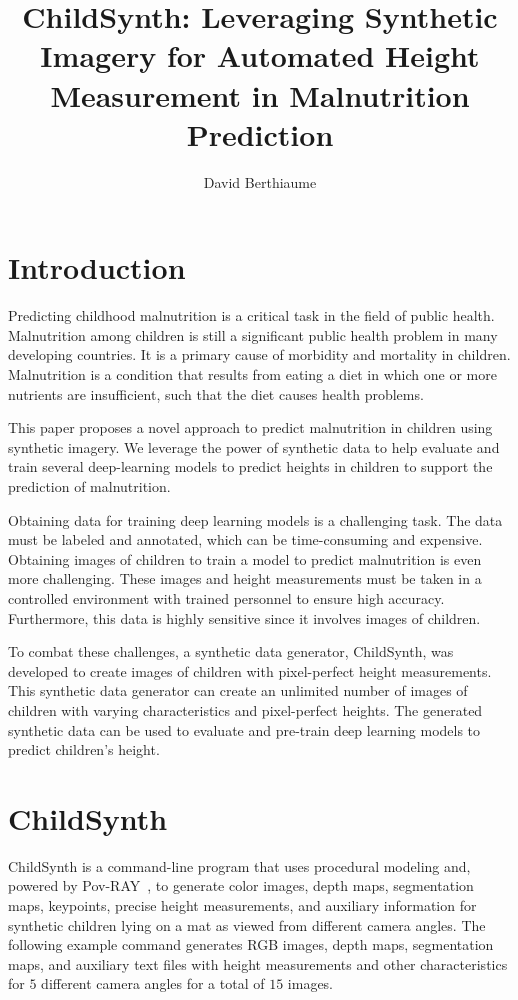 \documentclass{article}
\title{ChildSynth: Leveraging Synthetic Imagery for Automated Height Measurement in Malnutrition Prediction}
\author{David Berthiaume}
\begin{document}
\maketitle
\tableofcontents


\section{Introduction}

Predicting childhood malnutrition is a critical task in the field of public health. Malnutrition among children is still a significant public health problem in many developing countries. It is a primary cause of morbidity and mortality in children. Malnutrition is a condition that results from eating a diet in which one or more nutrients are insufficient, such that the diet causes health problems.

This paper proposes a novel approach to predict malnutrition in children using synthetic imagery. 
We leverage the power of synthetic data to help evaluate and train several deep-learning models to predict heights in children to support the prediction of malnutrition. 

Obtaining data for training deep learning models is a challenging task. The data must be labeled and annotated, which can be time-consuming and expensive. Obtaining images of children to train a model to predict malnutrition is even more challenging. These images and height measurements must be taken in a controlled environment with trained personnel to ensure high accuracy. Furthermore, this data is highly sensitive since it involves images of children.

To combat these challenges, a synthetic data generator, ChildSynth, was developed to create images of children with pixel-perfect height measurements. This synthetic data generator can create an unlimited number of images of children with varying characteristics and pixel-perfect heights. The generated synthetic data can be used to evaluate and pre-train deep learning models to predict children's height. 

\section{ChildSynth}

ChildSynth is a command-line program that uses procedural modeling and, powered by Pov-RAY~\cite{povray}, to generate color images, depth maps, segmentation maps, keypoints, precise height measurements, and auxiliary information for synthetic children lying on a mat as viewed from different camera angles. The following example command generates RGB images, depth maps, segmentation maps, and auxiliary text files with height measurements and other characteristics for $5$ different camera angles for a total of $15$ images. 
\end{document}
